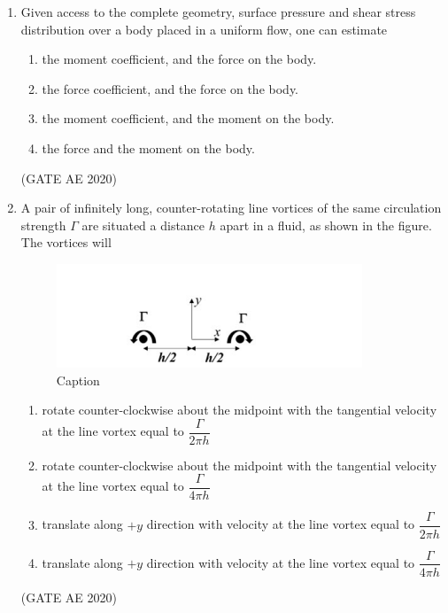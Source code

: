\documentclass[journal,12pt,onecolumn]{IEEEtran}
\theoremstyle{remark}
\begin{document}
\begin{enumerate}
\item Given access to the complete geometry, surface pressure and shear stress distribution over a body placed in a uniform flow, one can estimate
\begin{enumerate}
    \item the moment coefficient, and the force on the body.
    \item the force coefficient, and the force on the body.
    \item the moment coefficient, and the moment on the body.
    \item the force and the moment on the body.
\end{enumerate}
\hfill(GATE AE 2020)

\item A pair of infinitely long, counter-rotating line vortices of the same circulation strength $\Gamma$ are situated a distance $h$ apart in a fluid, as shown in the figure. The vortices will
\begin{figure}[H]
    \centering
    \includegraphics[width=0.5\columnwidth]{figs/Screenshot from 2025-08-17 15-53-02.png}
    \caption{Caption}
    \label{fig:placeholder}
\end{figure}
\begin{enumerate}
    \item rotate counter-clockwise about the midpoint with the tangential velocity at the line vortex equal to $\dfrac{\Gamma}{2 \pi h}$
    \item rotate counter-clockwise about the midpoint with the tangential velocity at the line vortex equal to $\dfrac{\Gamma}{4 \pi h}$
    \item translate along $+y$ direction with velocity at the line vortex equal to $\dfrac{\Gamma}{2 \pi h}$
    \item translate along $+y$ direction with velocity at the line vortex equal to $\dfrac{\Gamma}{4 \pi h}$
\end{enumerate}
\hfill(GATE AE 2020)


\end{enumerate}
\end{document}
